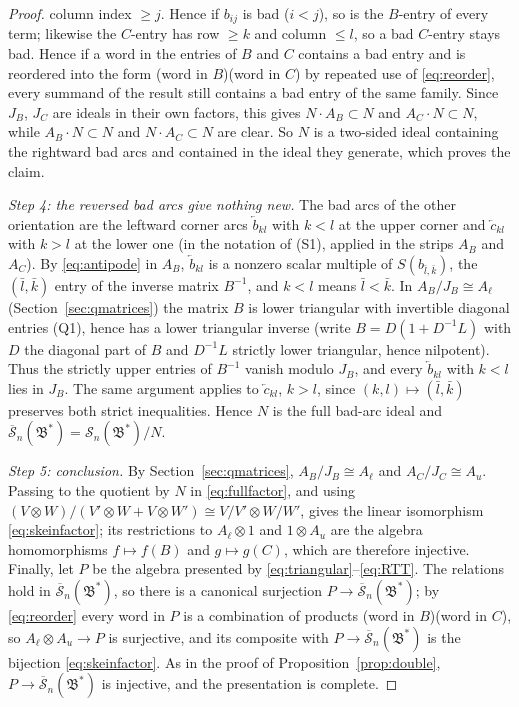 \documentclass[11pt]{article}
\theoremstyle{remark}
\newcommand{\Skein}{\mathcal S_n}
\newcommand{\redS}{\overline{\mathcal S}_n}
\newcommand{\Bstar}{\mathfrak B^*}
\newcommand{\ot}{\otimes}
\begin{document}
\begin{proof}
column index $\ge j$. Hence if $b_{ij}$ is bad ($i<j$), so is the $B$-entry of
every term; likewise the $C$-entry has row $\ge k$ and column $\le l$,
so a bad $C$-entry stays bad. Hence if a word in the entries of $B$
and $C$ contains a bad entry and is reordered into the form (word in
$B$)(word in $C$) by repeated use of \eqref{eq:reorder}, every summand
of the result still contains a bad entry of the same family. Since $J_B$, $J_C$ are ideals in their
own factors, this gives $N\cdot A_B\subset N$ and $A_C\cdot N\subset N$,
while $A_B\cdot N\subset N$ and $N\cdot A_C\subset N$ are clear. So $N$
is a two-sided ideal containing the rightward bad arcs and contained in
the ideal they generate, which proves the claim.

\emph{Step 4: the reversed bad arcs give nothing new.}
The bad arcs of the other orientation are the leftward corner arcs
$\overleftarrow b_{kl}$ with $k<l$ at the upper corner and
$\overleftarrow c_{kl}$ with $k>l$ at the lower one (in the notation
of (S1), applied in the strips $A_B$ and $A_C$). By
\eqref{eq:antipode} in $A_B$,
$\overleftarrow b_{kl}$ is a nonzero scalar multiple of
$S(b_{\bar l,\bar k})$, the $(\bar l,\bar k)$ entry of the inverse
matrix $B^{-1}$, and $k<l$ means $\bar l<\bar k$. In
$A_B/J_B\cong A_\ell$ (Section~\ref{sec:qmatrices}) the matrix $B$ is
lower triangular with invertible diagonal entries (Q1), hence has a
lower triangular inverse (write $B=D(1+D^{-1}L)$ with $D$ the diagonal
part of $B$ and $D^{-1}L$ strictly lower triangular, hence nilpotent).
Thus the strictly
upper entries of $B^{-1}$ vanish modulo $J_B$, and every
$\overleftarrow b_{kl}$ with $k<l$ lies in $J_B$. The same argument
applies to $\overleftarrow c_{kl}$, $k>l$, since
$(k,l)\mapsto(\bar l,\bar k)$ preserves both strict inequalities. Hence
$N$ is the full bad-arc ideal and $\redS(\Bstar)=\Skein(\Bstar)/N$.

\emph{Step 5: conclusion.}
By Section~\ref{sec:qmatrices}, $A_B/J_B\cong A_\ell$ and
$A_C/J_C\cong A_u$. Passing to the quotient by $N$ in
\eqref{eq:fullfactor}, and using
$(V\ot W)/(V'\ot W+V\ot W')\cong V/V'\ot W/W'$, gives the linear
isomorphism \eqref{eq:skeinfactor}; its restrictions to
$A_\ell\ot1$ and $1\ot A_u$ are the algebra homomorphisms
$f\mapsto f(B)$ and $g\mapsto g(C)$, which are therefore injective.
Finally, let $P$ be the algebra presented by
\eqref{eq:triangular}--\eqref{eq:RTT}. The relations hold in
$\redS(\Bstar)$, so there is a canonical surjection $P\to\redS(\Bstar)$;
by \eqref{eq:reorder} every word in $P$ is a combination of products
(word in $B$)(word in $C$), so $A_\ell\ot A_u\to P$ is surjective, and
its composite with $P\to\redS(\Bstar)$ is the bijection
\eqref{eq:skeinfactor}. As in the proof of
Proposition~\ref{prop:double}, $P\to\redS(\Bstar)$ is injective, and
the presentation is complete.
\end{proof}
\end{document}
